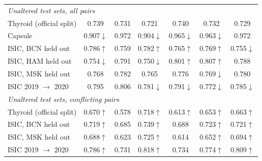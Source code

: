 \begin{table}[!tbp]
{\begin{tabular}{lcccccc}
\multicolumn{7}{l}{\emph{Unaltered test sets, all pairs}} \\
\quad Thyroid (official split) & 0.739 & 0.731 & 0.721 & 0.740 & 0.732 & 0.729 \\
\quad Capsule & 0.907$\downarrow$ & 0.972 & 0.904$\downarrow$ & 0.965$\downarrow$ & 0.963$\downarrow$ & 0.972 \\
\quad ISIC, BCN held out & 0.786$\uparrow$ & 0.759 & 0.782$\uparrow$ & 0.765$\uparrow$ & 0.769$\uparrow$ & 0.755$\downarrow$ \\
\quad ISIC, HAM held out & 0.754$\downarrow$ & 0.791 & 0.750$\downarrow$ & 0.801$\uparrow$ & 0.807$\uparrow$ & 0.788 \\
\quad ISIC, MSK held out & 0.768 & 0.782 & 0.765 & 0.776 & 0.769$\downarrow$ & 0.780 \\
\quad ISIC 2019 $\to$ 2020 & 0.795 & 0.806 & 0.781$\downarrow$ & 0.791$\downarrow$ & 0.772$\downarrow$ & 0.785$\downarrow$ \\
\multicolumn{7}{l}{\emph{Unaltered test sets, conflicting pairs}} \\
\quad Thyroid (official split) & 0.670$\uparrow$ & 0.578 & 0.718$\uparrow$ & 0.613$\uparrow$ & 0.653$\uparrow$ & 0.663$\uparrow$ \\
\quad ISIC, BCN held out & 0.719$\uparrow$ & 0.685 & 0.739$\uparrow$ & 0.688 & 0.723$\uparrow$ & 0.721$\uparrow$ \\
\quad ISIC, MSK held out & 0.688$\uparrow$ & 0.623 & 0.725$\uparrow$ & 0.614 & 0.652$\uparrow$ & 0.694$\uparrow$ \\
\quad ISIC 2019 $\to$ 2020 & 0.786$\uparrow$ & 0.731 & 0.818$\uparrow$ & 0.734 & 0.774$\uparrow$ & 0.809$\uparrow$ \\
\bottomrule\end{tabular}}
\end{table}
